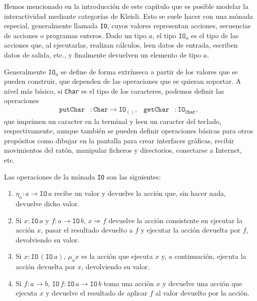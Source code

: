Hemos mencionado en la introducción de este capítulo que es posible modelar la
interactividad mediante categorías de Kleisli. Esto se suele hacer con una
mónada especial, generalmente llamada \texttt{IO}, cuyos valores representan
acciones, secuencias de acciones o programas enteros. Dado un tipo $a$, el tipo
$\mathtt{IO}_a$ es el tipo de las acciones que, al ejecutarlas, realizan
cálculos, leen datos de entrada, escriben datos de salida, etc., y finalmente
devuelven un elemento de tipo $a$.

Generalmente $\mathtt{IO}_a$ se define de forma extrínseca a partir de los
valores que se pueden construir, que dependen de las operaciones que se quieran
soportar. A nivel más básico, si \texttt{Char} es el tipo de los caracteres,
podemos definir las operaciones
\begin{align*}
  \mathtt{putChar} & : \mathtt{Char} \to \mathtt{IO}_{()}, & \mathtt{getChar} & : \mathtt{IO}_{\mathtt{Char}},
\end{align*}
que imprimen un caracter en la terminal y leen un caracter del teclado,
respectivamente, aunque también se pueden definir operaciones básicas para otros
propósitos como dibujar en la pantalla para crear interfaces gráficas, recibir
movimientos del ratón, manipular ficheros y directorios, conectarse a Internet,
etc.
\begin{samepage}
  Las operaciones de la mónada \texttt{IO} son las siguientes:
  \begin{enumerate}
  \item $\eta_a:a\to\mathtt{IO}\,a$ recibe un valor y devuelve la acción que,
    sin hacer nada, devuelve dicho valor.
  \item Si $x:\mathtt{IO}\,a$ y $f:a\to\mathtt{IO}\,b$, $x\Rightarrow f$
    devuelve la acción consistente en ejecutar la acción $x$, pasar el resultado
    devuelto a $f$ y ejecutar la acción devuelta por $f$, devolviendo su valor.
  \item Si $x:\mathtt{IO}\,(\mathtt{IO}\,a)$, $\mu_ax$ es la acción que ejecuta $x$
    y, a continuación, ejecuta la acción devuelta por $x$, devolviendo su valor.
  \item Si $f:a\to b$, $\mathtt{IO}\,f:\mathtt{IO}\,a\to\mathtt{IO}\,b$ toma una
    acción $x$ y devuelve una acción que ejecuta $x$ y devuelve el resultado de
    aplicar $f$ al valor devuelto por la acción.
  \end{enumerate}
\end{samepage}

